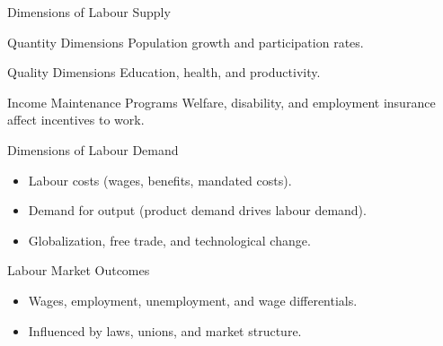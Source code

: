 \documentclass[aspectratio=169]{beamer}
\begin{document}
\begin{frame}{Dimensions of Labour Supply}
\begin{block}{Quantity Dimensions}
Population growth and participation rates.
\end{block}
\begin{block}{Quality Dimensions}
Education, health, and productivity.
\end{block}
\begin{block}{Income Maintenance Programs}
Welfare, disability, and employment insurance affect incentives to work.
\end{block}
\end{frame}

\begin{frame}{Dimensions of Labour Demand}
\begin{itemize}[<+->]
  \item Labour costs (wages, benefits, mandated costs).
  \item Demand for output (product demand drives labour demand).
  \item Globalization, free trade, and technological change.
\end{itemize}
\end{frame}

\begin{frame}{Labour Market Outcomes}
\begin{itemize}[<+->]
  \item Wages, employment, unemployment, and wage differentials.
  \item Influenced by laws, unions, and market structure.
\end{itemize}
\end{frame}
\end{document}
